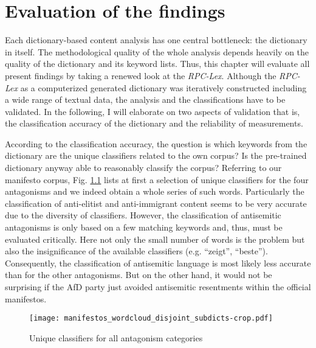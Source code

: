 \documentclass[a4paper]{scrreprt}
\begin{document}
\chapter{Evaluation of the findings}
Each dictionary-based content analysis has one central bottleneck: the dictionary in itself. The methodological quality of the whole analysis depends heavily on the quality of the dictionary and its keyword lists. Thus, this chapter will evaluate all present findings by taking a renewed look at the {\em RPC-Lex}. Although the {\em RPC-Lex} as a computerized generated dictionary was iteratively constructed including a wide range of textual data, the analysis and the classifications have to be validated. In the following, I will elaborate on two aspects of validation that is, the classification accuracy of the dictionary and the reliability of measurements.\par
According to the classification accuracy, the question is which keywords from the dictionary are the unique classifiers related to the own corpus? Is the pre-trained dictionary anyway able to reasonably classify the corpus? Referring to our manifesto corpus, Fig. \ref{fig:fig9} lists at first a selection of unique classifiers for the four antagonisms and we indeed obtain a whole series of such words. Particularly the classification of anti-elitist and anti-immigrant content seems to be very accurate due to the diversity of classifiers. However, the classification of antisemitic antagonisms is only based on a few matching keywords and, thus, must be evaluated critically. Here not only the small number of words is the problem but also the insignificance of the available classifiers (e.g. ``zeigt'', ``beste''). Consequently, the classification of antisemitic language is most likely less accurate than for the other antagonisms. But on the other hand, it would not be surprising if the AfD party just avoided antisemitic resentments within the official manifestos.\par
\begin{figure}
    \centering
    \texttt{[image: manifestos\_wordcloud\_disjoint\_subdicts-crop.pdf]}
    \caption{Unique classifiers for all antagonism categories}
    \label{fig:fig9}
\end{figure}
\end{document}
